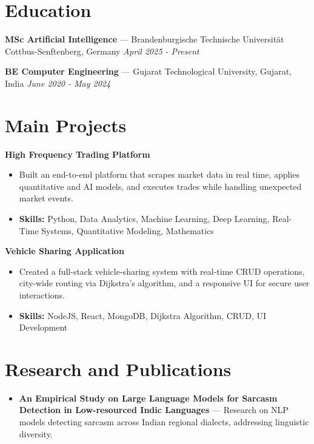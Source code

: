 \documentclass[a4paper,10pt]{article}
\begin{document}
\section*{Education}
\textbf{MSc Artificial Intelligence} — Brandenburgische Technische Universität Cottbus-Senftenberg, Germany \hfill \textit{April 2025 - Present}\par
\vspace{1.5pt}
\textbf{BE Computer Engineering} — Gujarat Technological University, Gujarat, India \hfill \textit{June 2020 - May 2024}\par

\section*{Main Projects}
\textbf{High Frequency Trading Platform}\par
\vspace{1pt}
\begin{itemize}
  \item Built an end-to-end platform that scrapes market data in real time, applies quantitative and AI models, and executes trades while handling unexpected market events.
  \item \textbf{Skills:} Python, Data Analytics, Machine Learning, Deep Learning, Real-Time Systems, Quantitative Modeling, Mathematics
\end{itemize}
\vspace{3pt}
\textbf{Vehicle Sharing Application}\par
\vspace{1pt}
\begin{itemize}
  \item Created a full-stack vehicle-sharing system with real-time CRUD operations, city-wide routing via Dijkstra's algorithm, and a responsive UI for secure user interactions.
  \item \textbf{Skills:} NodeJS, React, MongoDB, Dijkstra Algorithm, CRUD, UI Development
\end{itemize}

\section*{Research and Publications}
\begin{itemize}
\item \textbf{An Empirical Study on Large Language Models for Sarcasm Detection in Low-resourced Indic Languages} — Research on NLP models detecting sarcasm across Indian regional dialects, addressing linguistic diversity.
\end{itemize}
\end{document}
